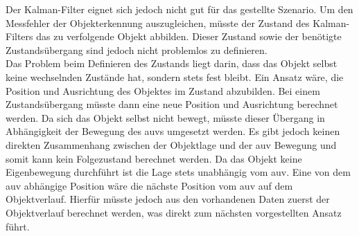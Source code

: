 Der Kalman-Filter eignet sich jedoch nicht gut für das gestellte Szenario. Um den Messfehler der Objekterkennung auszugleichen, müsste der Zustand des Kalman-Filters das zu verfolgende Objekt abbilden. Dieser Zustand sowie der benötigte Zustandsübergang sind jedoch nicht problemlos zu definieren.\\
Das Problem beim Definieren des Zustands liegt darin, dass das Objekt selbst keine wechselnden Zustände hat, sondern stets fest bleibt. Ein Ansatz wäre, die Position und Ausrichtung des Objektes im Zustand abzubilden. Bei einem Zustandsübergang müsste dann eine neue Position und Ausrichtung berechnet werden. Da sich das Objekt selbst nicht bewegt, müsste dieser Übergang in Abhängigkeit der Bewegung des \gls{auv}s umgesetzt werden. Es gibt jedoch keinen direkten Zusammenhang zwischen der Objektlage und der \gls{auv} Bewegung und somit kann kein Folgezustand berechnet werden. Da das Objekt keine Eigenbewegung durchführt ist die Lage stets unabhängig vom \gls{auv}. Eine von dem \gls{auv} abhängige Position wäre die nächste Position vom \gls{auv} auf dem Objektverlauf. Hierfür müsste jedoch aus den vorhandenen Daten zuerst der Objektverlauf berechnet werden, was direkt zum nächsten vorgestellten Ansatz führt.
